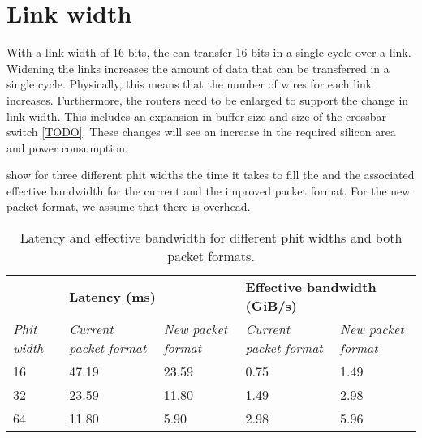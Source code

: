 \section{Link width}
With a link width of 16 bits, the \confignoc{} can transfer 16 bits in a single cycle over a link.
Widening the links increases the amount of data that can be transferred in a single cycle.
Physically, this means that the number of wires for each link increases.
Furthermore, the routers need to be enlarged to support the change in link width.
This includes an expansion in buffer size and size of the crossbar switch \cref{TODO}.
These changes will see an increase in the required silicon area and power consumption.

 show for three different phit widths the time it takes to fill the \graicore{} and the associated effective bandwidth for the current and the improved packet format.
For the new packet format, we assume that there is overhead.

\begin{table}[hbtp]
\centering
\begin{adjustbox}{width=\linewidth}
\begin{tabular}{@{}lllll@{}}
\toprule
                    & \multicolumn{2}{l}{\textbf{Latency (ms)}} & \multicolumn{2}{l}{\textbf{Effective bandwidth (GiB/s)}} \\ \cmidrule(lr){2-3} \cmidrule(lr){4-5}
\textit{Phit width} & \textit{Current packet format}    & \textit{New packet format}   & \textit{Current packet format}    & \textit{New packet format}   \\ \midrule
16                  & 47.19                    & 23.59               & 0.75                     & 1.49                \\
32                  & 23.59                    & 11.80               & 1.49                     & 2.98                \\
64                  & 11.80                    & 5.90                & 2.98                     & 5.96                \\ \bottomrule
\end{tabular}
\end{adjustbox}
\caption{Latency and effective bandwidth for different phit widths and both packet formats.}
\label{tab:latency_bandwidth_phit_width_packet_format}
\end{table}

